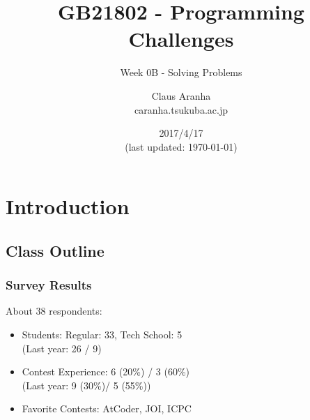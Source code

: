 \documentclass{beamer}
\title[GB21802]{GB21802 - Programming Challenges}
\subtitle[]{Week 0B - Solving Problems}
\author[Claus Aranha]{Claus Aranha\\{\footnotesize caranha\@@cs.tsukuba.ac.jp}}
\institute{Department of Computer Science}
\date{2017/4/17\\{\smaller(last updated: \today)}}
\begin{document}

\section{Introduction}
\subsection{Class Outline}

\begin{frame}
\maketitle
\end{frame}

\begin{frame}
  \frametitle{Survey Results}

  About 38 respondents:
  \begin{itemize}
  \item Students: Regular: 33, Tech School: 5\\
    (Last year: 26 / 9)

    \bigskip
    
  \item Contest Experience: 6 (20\%) / 3 (60\%)\\
    (Last year: 9 (30\%)/ 5 (55\%))

    \bigskip
    
  \item Favorite Contests: AtCoder, JOI, ICPC
  \end{itemize}
\end{frame}
\end{document}
